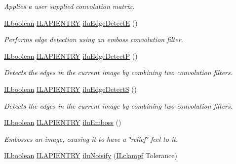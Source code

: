 \begin{DoxyCompactItemize}
\begin{DoxyCompactList}\small\item\em Applies a user supplied convolution matrix. \end{DoxyCompactList}\item 
\hyperlink{group__il__types_gaa6aa7c95cfdc06b4d8601ef832b7bb0a}{I\+Lboolean} \hyperlink{_i_l_8h_a69c08a8d06df986f7e46f209d131ef2f}{I\+L\+A\+P\+I\+E\+N\+T\+R\+Y} \hyperlink{group__ilu__filter_gafbd320c463d5e8a45e68d0edb3973597}{ilu\+Edge\+Detect\+E} ()
\begin{DoxyCompactList}\small\item\em Performs edge detection using an emboss convolution filter. \end{DoxyCompactList}\item 
\hyperlink{group__il__types_gaa6aa7c95cfdc06b4d8601ef832b7bb0a}{I\+Lboolean} \hyperlink{_i_l_8h_a69c08a8d06df986f7e46f209d131ef2f}{I\+L\+A\+P\+I\+E\+N\+T\+R\+Y} \hyperlink{group__ilu__filter_gac902e008927e48ce132306e344f5010d}{ilu\+Edge\+Detect\+P} ()
\begin{DoxyCompactList}\small\item\em Detects the edges in the current image by combining two convolution filters. \end{DoxyCompactList}\item 
\hyperlink{group__il__types_gaa6aa7c95cfdc06b4d8601ef832b7bb0a}{I\+Lboolean} \hyperlink{_i_l_8h_a69c08a8d06df986f7e46f209d131ef2f}{I\+L\+A\+P\+I\+E\+N\+T\+R\+Y} \hyperlink{group__ilu__filter_ga91f176b607f5357b748079e21a6bbc63}{ilu\+Edge\+Detect\+S} ()
\begin{DoxyCompactList}\small\item\em Detects the edges in the current image by combining two convolution filters. \end{DoxyCompactList}\item 
\hyperlink{group__il__types_gaa6aa7c95cfdc06b4d8601ef832b7bb0a}{I\+Lboolean} \hyperlink{_i_l_8h_a69c08a8d06df986f7e46f209d131ef2f}{I\+L\+A\+P\+I\+E\+N\+T\+R\+Y} \hyperlink{group__ilu__filter_gab94eba669177860af590c7bed1927c30}{ilu\+Emboss} ()
\begin{DoxyCompactList}\small\item\em Embosses an image, causing it to have a \char`\"{}relief\char`\"{} feel to it. \end{DoxyCompactList}\item 
\hyperlink{group__il__types_gaa6aa7c95cfdc06b4d8601ef832b7bb0a}{I\+Lboolean} \hyperlink{_i_l_8h_a69c08a8d06df986f7e46f209d131ef2f}{I\+L\+A\+P\+I\+E\+N\+T\+R\+Y} \hyperlink{group__ilu__filter_gac4c1596626e01c41075c7fdeda113642}{ilu\+Noisify} (\hyperlink{group__il__types_gae90d8075bf3ef2cd89c09b26fd4dbef2}{I\+Lclampf} Tolerance)

\end{DoxyCompactItemize}
